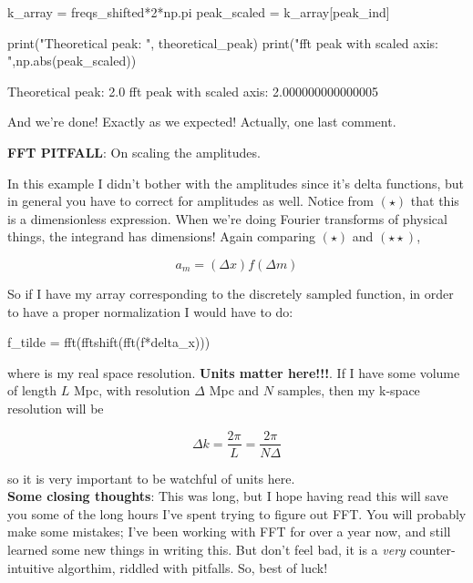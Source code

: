 \documentclass[a4paper]{article}
\newenvironment{colbox}[1]
  {\newcommand\colboxcolor{#1}%
   \begin{lrbox}{\selvestebox}%
   \begin{minipage}{\dimexpr\columnwidth-2\fboxsep\relax}}
  {\end{minipage}\end{lrbox}%
   \begin{center}
   \colorbox[HTML]{\colboxcolor}{\usebox{\selvestebox}}
   \end{center}}
\begin{document}
\begin{pyin}
k_array = freqs_shifted*2*np.pi
peak_scaled = k_array[peak_ind]

print("Theoretical peak: ", theoretical_peak)
print("fft peak with scaled axis: ",np.abs(peak_scaled))
\end{pyin}

\begin{pyprint}
Theoretical peak:  2.0
fft peak with scaled axis:  2.000000000000005
\end{pyprint}

And we're done! Exactly as we expected! Actually, one last comment.


\begin{colbox}{F8E0E0}
    \textbf{FFT PITFALL}: On scaling the amplitudes.
\end{colbox}

In this example I didn't bother with the amplitudes since it's delta functions, but in general you have to correct for amplitudes as well. Notice from $(\star)$ that this is a dimensionless expression. When we're doing Fourier transforms of physical things, the integrand has dimensions! Again comparing $(\star)$ and $(\star \star)$, 

\begin{equation*}
    a_m = (\Delta x)f(\Delta m)
\end{equation*}

So if I have my array  corresponding to the discretely sampled function, in order to have a proper normalization I would have to do: 

\begin{pyin}
    f_tilde = fft(fftshift(fft(f*delta_x)))
\end{pyin}

where  is my real space resolution. \textbf{Units matter here!!!}. If I have some volume of length $L$ Mpc, with resolution $\Delta$ Mpc and $N$ samples, then my k-space resolution will be 

\begin{equation*}
    \Delta k = \frac{2\pi}{L} = \frac{2\pi}{N\Delta}
\end{equation*}

so it is very important to be watchful of units here. \\


\textbf{Some closing thoughts}: This was long, but I hope having read this will save you some of the long hours I've spent trying to figure out FFT. You will probably make some mistakes; I've been working with FFT for over a year now, and still learned some new things in writing this. But don't feel bad, it is a \textit{very} counter-intuitive algorthim, riddled with pitfalls. So, best of luck!
\end{document}
